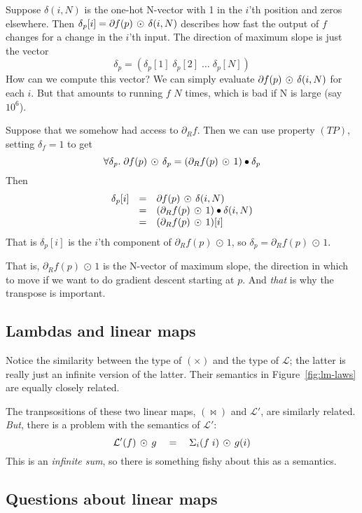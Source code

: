 \documentclass[sigplan,review]{acmart}
\newcommand{\deriv}{\partial}  %
\newcommand{\gradf}[1]{\deriv\hspace{-0.15mm} #1}  %
\newcommand{\gradft}[1]{\deriv_R#1}  %
\newcommand{\deltafun}[2]{\delta(#1,#2)}
\renewcommand{\d}[1]{\delta_{\mathit{#1}}}   %
\newcommand{\dotprod}{\bullet}    %
\newcommand{\lmcomp}{\,\circ\,}   %
\newcommand{\lmvcat}{\times}         %
\newcommand{\lmhcat}{\bowtie}        %
\newcommand{\lmapply}{\,\odot\,}      %
\newcommand{\lmlam}{{\mathcal L}}      %
\newcommand{\lmlamt}{{\mathcal L'}}     %
\begin{document}
Suppose $\deltafun i N$ is the one-hot N-vector with 1 in the $i$'th position and zeros elsewhere.
Then $\d{p}[i] = \gradf{f}(p) \lmapply \deltafun i N$ describes how fast the output of $f$ changes
for a change in the $i$'th input.  The direction of maximum slope is just the vector
$$\d{p} = (\d{p}[1]\; \d{p}[2] \; \ldots \; \d{p}[N])$$
How can we compute this vector?  We can simply evaluate $\gradf{f}(p) \lmapply \deltafun i N$ for each $i$.
But that amounts to running $f$ $N$ times, which is bad if N is large (say $10^6$).

Suppose that we somehow had access to $\gradft{f}$.  Then we can use property $(TP)$, setting $\d{f} = 1$
to get
$$
\forall \d{p}.\; \gradf{f}(p) \lmapply \d{p} = (\gradft{f}(p) \lmapply 1) \dotprod \d{p}
$$
Then
$$
\begin{array}{rcl}
  \d{p}[i] & = & \gradf{f}(p) \lmapply \deltafun i N \\
  & = & (\gradft{f}(p) \lmapply 1) \dotprod \deltafun i N \\
  & = & (\gradft{f}(p) \lmapply 1)[i]
\end{array}
$$
That is $\d{p}[i]$ is the $i$'th component of $\gradft{f}(p) \lmapply 1$,
so $\d{p} = \gradft{f}(p) \lmapply 1$.

That is, $\gradft{f}(p) \lmapply 1$ is the N-vector of maximum slope, the direction in which to
move if we want to do gradient descent starting at $p$.  And \emph{that} is why the transpose
is important.

\subsection{Lambdas and linear maps}

Notice the similarity between the type of $(\lmvcat)$ and the type of $\lmlam$; the latter is really
just an infinite version of the latter.
Their semantics in Figure~\ref{fig:lm-laws} are equally closely  related.

The tranpsositions of these two linear maps, $(\lmhcat)$ and $\lmlamt$, are
similarly related. \emph{But}, there is a problem with the semantics of
$\lmlamt$:
$$
   \lmlamt(f) \lmapply g \quad = \quad \Sigma_i (f \;i) \lmapply g(i) \\
$$
This is an \emph{infinite sum}, so there is something fishy about this as a semantics.


\subsection{Questions about linear maps}
\end{document}
